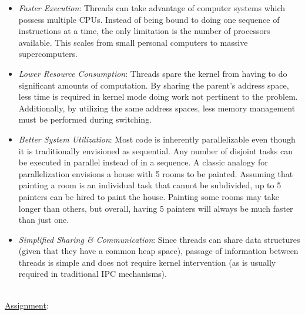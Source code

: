 \documentclass[12pt]{extarticle}
\newenvironment{myindentpar}[1]%
 {\begin{list}{}%
         {\setlength{\leftmargin}{#1}}%
         \item[]%
 }
 {\end{list}}
\begin{document}
\begin{myindentpar}{5mm}
\begin{itemize}
        \item \emph{Faster Execution}: Threads can take advantage of computer systems which possess multiple CPUs.  Instead of being bound to doing one sequence of instructions at a time, the only limitation is the number of processors available.  This scales from small personal computers to massive supercomputers.  
        \item \emph{Lower Resource Consumption}: Threads spare the kernel from having to do significant amounts of computation.  By sharing the parent's address space, less time is required in kernel mode doing work not pertinent to the problem.  Additionally, by utilizing the same address spaces, less memory management must be performed during switching.  
        \item \emph{Better System Utilization}: Most code is inherently parallelizable even though it is traditionally envisioned as sequential.  Any number of disjoint tasks can be executed in parallel instead of in a sequence.  A classic analogy for parallelization envisions a house with 5 rooms to be painted.  Assuming that painting a room is an individual task that cannot be subdivided, up to 5 painters can be hired to paint the house.  Painting some rooms may take longer than others, but overall, having 5 painters will always be much faster than just one.  
        \item \emph{Simplified Sharing \& Communication}: Since threads can share data structures (given that they have a common heap space), passage of information between threads is simple and does not require kernel intervention (as is usually required in traditional IPC mechanisms).  
        
    \end{itemize}

\end{myindentpar}

\ \\
{\large \underline{Assignment}:}
\end{document}
